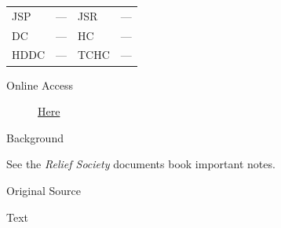 			\begin{tabular}{p{0.5in}p{1in}p{0.5in}p{1in}}
				JSP	 	& ---		& JSR 		& --- \\
				DC	 	& ---		& HC 		& --- \\
				HDDC 	& ---		& TCHC 		& --- \\
			\end{tabular}
			
			\begin{description}
				\item[Online Access] \href{https://www.josephsmithpapers.org/paper-summary/minutes-and-discourse-31-march-1842/1}{Here}
			\end{description}
			
			\begin{description}
				\item[Background]
			\end{description}
			
				See the \textit{Relief Society} documents book important notes.
			
			
			\begin{description}
				\item[Original Source]
			\end{description}
			
			
			\begin{description}
				\item[Text]
			\end{description}
			

